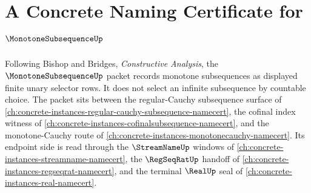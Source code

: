 \chapter{A Concrete Naming Certificate for $\MonotoneSubsequenceUp$}
\label{ch:concrete-instances-monotone-subsequence-namecert}

Following Bishop and Bridges, \emph{Constructive Analysis}, the $\MonotoneSubsequenceUp$ packet records monotone subsequences as displayed finite unary selector rows. It does not select an infinite subsequence by countable choice. The packet sits between the regular-Cauchy subsequence surface of \autoref{ch:concrete-instances-regular-cauchy-subsequence-namecert}, the cofinal index witness of \autoref{ch:concrete-instances-cofinalsubsequence-namecert}, and the monotone-Cauchy route of \autoref{ch:concrete-instances-monotonecauchy-namecert}. Its endpoint side is read through the $\StreamNameUp$ windows of \autoref{ch:concrete-instances-streamname-namecert}, the $\RegSeqRatUp$ handoff of \autoref{ch:concrete-instances-regseqrat-namecert}, and the terminal $\RealUp$ seal of \autoref{ch:concrete-instances-real-namecert}.

